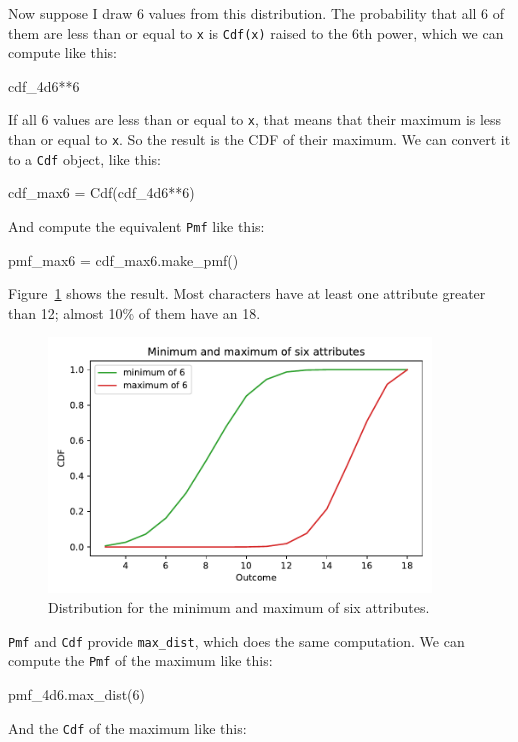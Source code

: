 \documentclass[12pt]{book}
\theoremstyle{exercise}
\newcommand{\py}[1]{{\tt #1}}%
\begin{document}
Now suppose I draw 6 values from this distribution.
The probability that all 6 of them are less than or equal to \py{x} is \py{Cdf(x)} raised to the 6th power, which we can compute like this:

\begin{code}
cdf_4d6**6
\end{code}

If all 6 values are less than or equal to \py{x}, that means that their maximum is less than or equal to \py{x}.
So the result is the CDF of their maximum.
We can convert it to a \py{Cdf} object, like this:

\begin{code}
cdf_max6 = Cdf(cdf_4d6**6)
\end{code}

And compute the equivalent \py{Pmf} like this:

\begin{code}
pmf_max6 = cdf_max6.make_pmf()
\end{code}

Figure~\ref{fig06-03} shows the result.
Most characters have at least one attribute greater than 12; almost 10\% of them have an 18.

\begin{figure}
\centerline{\includegraphics[width=4in]{figs/fig06-03.pdf}}
\caption{Distribution for the minimum and maximum of six attributes.}
\label{fig06-03}
\end{figure}

\py{Pmf} and \py{Cdf} provide \py{max_dist}, which does the same computation.
We can compute the \py{Pmf} of the maximum like this:

\begin{code}
pmf_4d6.max_dist(6)
\end{code}

And the \py{Cdf} of the maximum like this:
\end{document}

